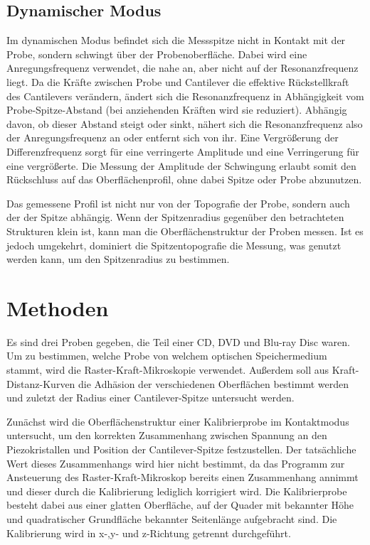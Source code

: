 \documentclass[
	a4paper,
	12pt,
	pagesize,
	ngerman
]{scrartcl}
\begin{document}
	\subsection{Dynamischer Modus}
	Im dynamischen Modus befindet sich die Messspitze nicht in Kontakt mit der Probe, sondern schwingt über der Probenoberfläche.
	Dabei wird eine Anregungsfrequenz verwendet, die nahe an, aber nicht auf der Resonanzfrequenz liegt.
	Da die Kräfte zwischen Probe und Cantilever die effektive Rückstellkraft des Cantilevers verändern, ändert sich die Resonanzfrequenz in Abhängigkeit vom Probe-Spitze-Abstand (bei anziehenden Kräften wird sie reduziert).
	Abhängig davon, ob dieser Abstand steigt oder sinkt, nähert sich die Resonanzfrequenz also der Anregungsfrequenz an oder entfernt sich von ihr.
	Eine Vergrößerung der Differenzfrequenz sorgt für eine verringerte Amplitude und eine Verringerung für eine vergrößerte.
	Die Messung der Amplitude der Schwingung erlaubt somit den Rückschluss auf das Oberflächenprofil, ohne dabei Spitze oder Probe abzunutzen.

	Das gemessene Profil ist nicht nur von der Topografie der Probe, sondern auch der der Spitze abhängig.
	Wenn der Spitzenradius gegenüber den betrachteten Strukturen klein ist, kann man die Oberflächenstruktur der Proben messen.
	Ist es jedoch umgekehrt, dominiert die Spitzentopografie die Messung, was genutzt werden kann, um den Spitzenradius zu bestimmen. %

	\section{Methoden}
	\label{sec_methoden}
	Es sind drei Proben gegeben, die Teil einer CD, DVD und Blu-ray Disc waren.
	Um zu bestimmen, welche Probe von welchem optischen Speichermedium stammt, wird die Raster-Kraft-Mikroskopie verwendet.
	Außerdem soll aus Kraft-Distanz-Kurven die Adhäsion der verschiedenen Oberflächen bestimmt werden und zuletzt der Radius einer Cantilever-Spitze untersucht werden.

	Zunächst wird die Oberflächenstruktur einer Kalibrierprobe im Kontaktmodus untersucht, um den korrekten Zusammenhang zwischen Spannung an den Piezokristallen und Position der Cantilever-Spitze festzustellen.
	Der tatsächliche Wert dieses Zusammenhangs wird hier nicht bestimmt, da das Programm zur Ansteuerung des Raster-Kraft-Mikroskop bereits einen Zusammenhang annimmt und dieser durch die Kalibrierung lediglich korrigiert wird.
	Die Kalibrierprobe besteht dabei aus einer glatten Oberfläche, auf der Quader mit bekannter Höhe und quadratischer Grundfläche bekannter Seitenlänge aufgebracht sind.
	Die Kalibrierung wird in x-,y- und z-Richtung getrennt durchgeführt.
\end{document}

